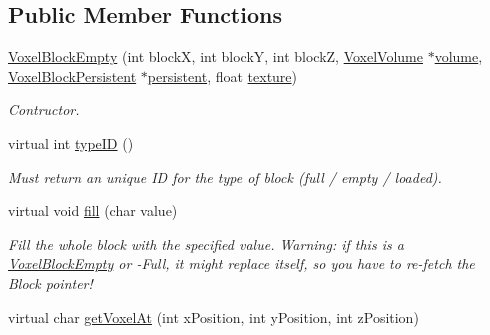 \subsection*{\-Public \-Member \-Functions}
\begin{DoxyCompactItemize}
\item 
\hypertarget{classVoxelBlockEmpty_a8ce0638ddc2853241b32e7b24101ebde}{
\hyperlink{classVoxelBlockEmpty_a8ce0638ddc2853241b32e7b24101ebde}{\-Voxel\-Block\-Empty} (int block\-X, int block\-Y, int block\-Z, \hyperlink{classVoxelVolume}{\-Voxel\-Volume} $\ast$\hyperlink{classVoxelBlock_aa8398251c9d5d3ba466e8993bcb6eb38}{volume}, \hyperlink{classVoxelBlockPersistent}{\-Voxel\-Block\-Persistent} $\ast$\hyperlink{classVoxelBlock_ad9d2e2c26398379b6a92e2e5ea4ab20d}{persistent}, float \hyperlink{classVoxelBlockEmpty_aa79635ef8757a07beee30a7f055e9759}{texture})}
\label{d1/dee/classVoxelBlockEmpty_a8ce0638ddc2853241b32e7b24101ebde}

\begin{DoxyCompactList}\small\item\em \-Contructor. \end{DoxyCompactList}\item 
\hypertarget{classVoxelBlockEmpty_a904b4d498be483c8780437eb1be13d96}{
virtual int \hyperlink{classVoxelBlockEmpty_a904b4d498be483c8780437eb1be13d96}{type\-I\-D} ()}
\label{d1/dee/classVoxelBlockEmpty_a904b4d498be483c8780437eb1be13d96}

\begin{DoxyCompactList}\small\item\em \-Must return an unique \-I\-D for the type of block (full / empty / loaded). \end{DoxyCompactList}\item 
\hypertarget{classVoxelBlockEmpty_ad26b4142fe2ab9e3e6d02eb44cbe9942}{
virtual void \hyperlink{classVoxelBlockEmpty_ad26b4142fe2ab9e3e6d02eb44cbe9942}{fill} (char value)}
\label{d1/dee/classVoxelBlockEmpty_ad26b4142fe2ab9e3e6d02eb44cbe9942}

\begin{DoxyCompactList}\small\item\em \-Fill the whole block with the specified value. \-Warning\-: if this is a \hyperlink{classVoxelBlockEmpty}{\-Voxel\-Block\-Empty} or -\/\-Full, it might replace itself, so you have to re-\/fetch the \-Block pointer! \end{DoxyCompactList}\item 
\hypertarget{classVoxelBlockEmpty_afdcb55e41d8ea8e855e759c91e17a970}{
virtual char \hyperlink{classVoxelBlockEmpty_afdcb55e41d8ea8e855e759c91e17a970}{get\-Voxel\-At} (int x\-Position, int y\-Position, int z\-Position)}
\label{d1/dee/classVoxelBlockEmpty_afdcb55e41d8ea8e855e759c91e17a970}


\end{DoxyCompactItemize}
